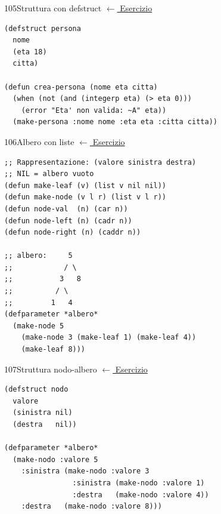 \label{sol:105}
\begin{solbox}{105}{Struttura con defstruct}
\small\color{black!55}\hyperref[ex:105]{$\leftarrow$ Esercizio}\normalsize\color{black}
\begin{lstlisting}
(defstruct persona
  nome
  (eta 18)
  citta)

(defun crea-persona (nome eta citta)
  (when (not (and (integerp eta) (> eta 0)))
    (error "Eta' non valida: ~A" eta))
  (make-persona :nome nome :eta eta :citta citta))
\end{lstlisting}
\end{solbox}

\label{sol:106}
\begin{solbox}{106}{Albero con liste}
\small\color{black!55}\hyperref[ex:106]{$\leftarrow$ Esercizio}\normalsize\color{black}
\begin{lstlisting}
;; Rappresentazione: (valore sinistra destra)
;; NIL = albero vuoto
(defun make-leaf (v) (list v nil nil))
(defun make-node (v l r) (list v l r))
(defun node-val  (n) (car n))
(defun node-left (n) (cadr n))
(defun node-right (n) (caddr n))

;; albero:     5
;;            / \
;;           3   8
;;          / \
;;         1   4
(defparameter *albero*
  (make-node 5
    (make-node 3 (make-leaf 1) (make-leaf 4))
    (make-leaf 8)))
\end{lstlisting}
\end{solbox}

\label{sol:107}
\begin{solbox}{107}{Struttura nodo-albero}
\small\color{black!55}\hyperref[ex:107]{$\leftarrow$ Esercizio}\normalsize\color{black}
\begin{lstlisting}
(defstruct nodo
  valore
  (sinistra nil)
  (destra   nil))

(defparameter *albero*
  (make-nodo :valore 5
    :sinistra (make-nodo :valore 3
                :sinistra (make-nodo :valore 1)
                :destra   (make-nodo :valore 4))
    :destra   (make-nodo :valore 8)))
\end{lstlisting}
\end{solbox}

